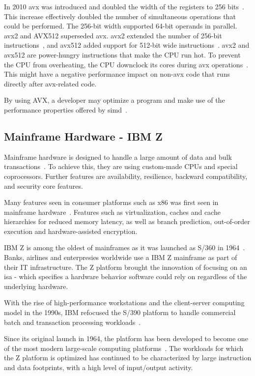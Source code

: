 In 2010 \gls{avx} was introduced and doubled the width of the registers to 256 bits~\cite{hennessy2011:avx, intel:avx}. This increase effectively doubled the number of simultaneous operations that could be performed. The 256-bit width supported 64-bit operands in parallel. \gls{avx2} and AVX512 superseded \gls{avx}. \gls{avx2} extended the number of 256-bit instructions~\cite{intel:manual:2020}, and \gls{avx512} added support for 512-bit wide instructions~\cite{intel:avx512}. \gls{avx2} and \gls{avx512} are power-hungry instructions that make the CPU run hot. To prevent the CPU from overheating, the CPU downclock its cores during \gls{avx} operations~\cite{hackenberg2015, intel:manual:2020}. This might have a negative performance impact on non-\gls{avx} code that runs directly after \gls{avx}-related code.

By using AVX, a developer may optimize a program and make use of the performance properties offered by \gls{simd}~\cite{hennessy2011:avx}.

\subsection{Mainframe Hardware - IBM Z}

Mainframe hardware is designed to handle a large amount of data and bulk transactions~\cite{mainframes}. To achieve this, they are using custom-made CPUs and special coprocessors. Further features are availability, resilience, backward compatibility, and security core features.

Many features seen in consumer platforms such as \gls{x86} was first seen in mainframe hardware~\cite{jacobi2020}. Features such as virtualization, caches and cache hierarchies for reduced memory latency, as well as branch prediction, out-of-order execution and hardware-assisted encryption.

IBM Z is among the oldest of mainframes as it was launched as S/360 in 1964~\cite{jacobi2020}. Banks, airlines and enterpresies worldwide use a IBM Z mainframe as part of their IT infrastructure. The Z platform brought the innovation of focusing on an \acrfull{isa} - which specifies a hardware behavior software could rely on regardless of the underlying hardware.

With the rise of high-performance workstations and the client-server computing model in the 1990s, IBM refocused the S/390 platform to handle commercial batch and transaction processing workloads~\cite{jacobi2020}. 

Since its original launch in 1964, the platform has been developed to become one of the most modern large-scale computing platforms~\cite{jacobi2020}. The workloads for which the Z platform is optimized has continued to be characterized by large instruction and data footprints, with a high level of input/output activity.

